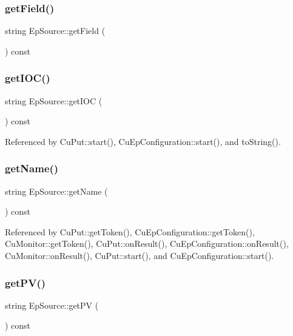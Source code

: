 \subsubsection{get\+Field()}
{\footnotesize\ttfamily string Ep\+Source\+::get\+Field (\begin{DoxyParamCaption}{ }\end{DoxyParamCaption}) const}

\mbox{\label{classEpSource_a02247d03c99709ce0953e410f771faba}} 
\subsubsection{get\+I\+O\+C()}
{\footnotesize\ttfamily string Ep\+Source\+::get\+I\+OC (\begin{DoxyParamCaption}{ }\end{DoxyParamCaption}) const}



Referenced by Cu\+Put\+::start(), Cu\+Ep\+Configuration\+::start(), and to\+String().

\mbox{\label{classEpSource_a86cb212076d70e189f4e4f4abcc5363c}} 
\subsubsection{get\+Name()}
{\footnotesize\ttfamily string Ep\+Source\+::get\+Name (\begin{DoxyParamCaption}{ }\end{DoxyParamCaption}) const}



Referenced by Cu\+Put\+::get\+Token(), Cu\+Ep\+Configuration\+::get\+Token(), Cu\+Monitor\+::get\+Token(), Cu\+Put\+::on\+Result(), Cu\+Ep\+Configuration\+::on\+Result(), Cu\+Monitor\+::on\+Result(), Cu\+Put\+::start(), and Cu\+Ep\+Configuration\+::start().

\mbox{\label{classEpSource_a27eaf4b50e154bdc521dbe7489e5b889}} 
\subsubsection{get\+P\+V()}
{\footnotesize\ttfamily string Ep\+Source\+::get\+PV (\begin{DoxyParamCaption}{ }\end{DoxyParamCaption}) const}



